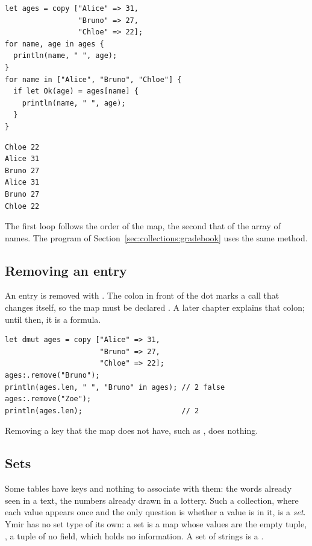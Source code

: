 \begin{lstlisting}[style=coloredverbatim]
let ages = copy ["Alice" => 31,
                 "Bruno" => 27,
                 "Chloe" => 22];
for name, age in ages {
  println(name, " ", age);
}
for name in ["Alice", "Bruno", "Chloe"] {
  if let Ok(age) = ages[name] {
    println(name, " ", age);
  }
}
\end{lstlisting}
\vspace{-10pt}%
\begin{lstlisting}[style=bashVerb]
Chloe 22
Alice 31
Bruno 27
Alice 31
Bruno 27
Chloe 22
\end{lstlisting}

The first loop follows the order of the map, the second that of the array of
names. The program of Section~\ref{sec:collections:gradebook} uses the same
method.

\subsection{Removing an entry}

An entry is removed with . The colon in front of the dot
marks a call that changes  itself, so the map must be declared
. A later chapter explains that colon; until then, it is a formula.

\begin{lstlisting}[style=coloredverbatim]
let dmut ages = copy ["Alice" => 31,
                      "Bruno" => 27,
                      "Chloe" => 22];
ages:.remove("Bruno");
println(ages.len, " ", "Bruno" in ages); // 2 false
ages:.remove("Zoe");
println(ages.len);                       // 2
\end{lstlisting}

Removing a key that the map does not have, such as , does nothing.

\subsection{Sets}

Some tables have keys and nothing to associate with them: the words already seen
in a text, the numbers already drawn in a lottery. Such a collection, where each
value appears once and the only question is whether a value is in it, is a
\textit{set}. Ymir has no set type of its own: a set is a map whose values are
the empty tuple, \token{()}, a tuple of no field, which holds no information. A
set of strings is a \token{[[c8] => ()]}.

